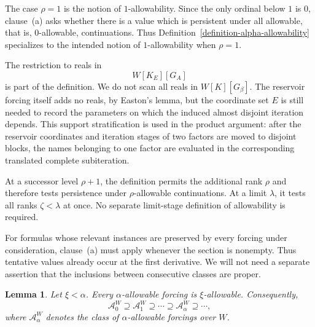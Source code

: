 \documentclass[a4paper,11pt]{article}
\newtheorem{lemma}[theorem]{Lemma}
\begin{document}
The case $\rho=1$ is the notion of $1$-allowability.  Since the only ordinal below $1$ is $0$, clause~\textup{(a)} asks whether there is a value which is persistent under all allowable, that is, $0$-allowable, continuations.  Thus Definition~\ref{definition-alpha-allowability} specializes to the intended notion of $1$-allowability when $\rho=1$.

The restriction to reals in
\[
   W[K_E][G_A]
\]
is part of the definition.  We do not scan all reals in $W[K][G_\beta]$.  The reservoir forcing itself adds no reals, by Easton's lemma, but the coordinate set $E$ is still needed to record the parameters on which the induced almost disjoint iteration depends.  This support stratification is used in the product argument: after the reservoir coordinates and iteration stages of two factors are moved to disjoint blocks, the names belonging to one factor are evaluated in the corresponding translated complete subiteration.

At a successor level $\rho+1$, the definition permits the additional rank $\rho$ and therefore tests persistence under $\rho$-allowable continuations.  At a limit $\lambda$, it tests all ranks $\zeta<\lambda$ at once.  No separate limit-stage definition of allowability is required.

For formulas whose relevant instances are preserved by every forcing under consideration, clause~\textup{(a)} must apply whenever the section is nonempty.  Thus tentative values already occur at the first derivative.  We will not need a separate assertion that the inclusions between consecutive classes are proper.

\begin{lemma}
\label{shrinkinglemma}
Let $\xi<\alpha$.  Every $\alpha$-allowable forcing is $\xi$-allowable.  Consequently,
\[
   \mathcal A^W_0\supseteq\mathcal A^W_1\supseteq\cdots
   \supseteq\mathcal A^W_\alpha\supseteq\cdots,
\]
where $\mathcal A^W_\alpha$ denotes the class of $\alpha$-allowable forcings over $W$.
\end{lemma}
\end{document}

